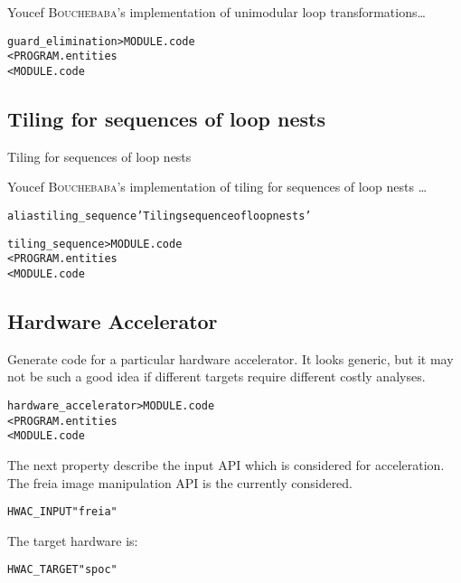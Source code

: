 \documentclass[a4paper]{report}
\newenvironment{PipsProp}{\begin{alltt}}{\end{alltt}}
\newenvironment{PipsMake}{\begin{alltt}}{\end{alltt}}
\begin{document}
Youcef \textsc{Bouchebaba}'s implementation of unimodular loop
transformations\ldots

\begin{PipsMake}
guard_elimination       > MODULE.code
        < PROGRAM.entities
        < MODULE.code
\end{PipsMake}

\subsection{Tiling for sequences of loop nests }
\label{subsection-tiling-for-sequences-loop-ness}

Tiling for sequences of loop nests

Youcef \textsc{Bouchebaba}'s implementation of tiling for sequences of
loop nests \ldots

\begin{PipsMake}
alias tiling_sequence 'Tiling sequence of loop nests'
\end{PipsMake}

\begin{PipsMake}
tiling_sequence      > MODULE.code
        < PROGRAM.entities
        < MODULE.code
\end{PipsMake}

\subsection{Hardware Accelerator}
\label{hardware-accelerator}

Generate code for a particular hardware accelerator.
It looks generic, but it may not be such a good idea if
different targets require different costly analyses.

\begin{PipsMake}
hardware_accelerator	> MODULE.code
        < PROGRAM.entities
        < MODULE.code
\end{PipsMake}

The next property describe the input API which is considered for
acceleration. The freia image manipulation API is the currently considered.
\begin{PipsProp}
HWAC_INPUT "freia"
\end{PipsProp}

The target hardware is:
\begin{PipsProp}
HWAC_TARGET "spoc"
\end{PipsProp}
\end{document}
